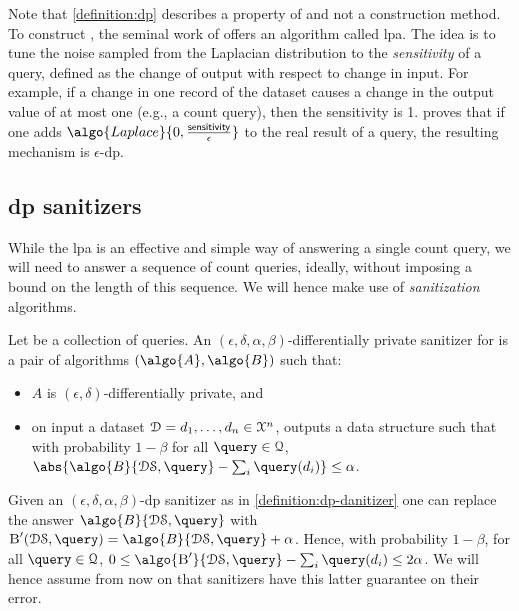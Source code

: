 		Note that \cref{definition:dp} describes a property of  and not a construction method.
		To construct , the seminal work of \textcite{differential-privacy-original} offers an algorithm called \acrfull{lpa}.
		The idea is to tune the noise sampled from the Laplacian distribution to the \emph{sensitivity} of a query, defined as the change of output with respect to change in input.
		For example, if a change in one record of the dataset causes a change in the output value of at most one (e.g., a count query), then the sensitivity is 1.
		\cite{differential-privacy-original} proves that if one adds $\algo{Laplace}{0, \frac{\mathsf{sensitivity}}{\epsilon}}$ to the real result of a query, the resulting mechanism is $\epsilon$-\acrshort{dp}.

		\subsection{\texorpdfstring{\acrshort{dp}}{DP} sanitizers}\label{section:background:dp-sanitizers}

			While the \acrlong{lpa} is an effective and simple way of answering a single count query, we will need to answer a sequence of count queries, ideally, without imposing a bound on the length of this sequence.
			We will hence make use of \emph{sanitization} algorithms.

			\begin{definition}\label{definition:dp-danitizer}
				Let \querySet{} be a collection of queries.
				An $(\epsilon, \delta, \alpha, \beta)$-differentially private sanitizer for \querySet{} is a pair of algorithms $(\algo{A}, \algo{B})$ such that:
				\begin{itemize}
					\item $A$ is $(\epsilon, \delta)$-differentially private, and
					\item on input a dataset $\mathcal{D} = d_1, \allowbreak \ldots, \allowbreak d_{n} \in \mathcal{X}^{n}$,  outputs a data structure \serverDS{} such that with probability $1 - \beta$ for all $\query \in \querySet$, $\abs{ \algo{B}{ \serverDS, \query } - \sum_i \query(d_i) } \leq \alpha$.
				\end{itemize}
			\end{definition}

			\begin{remark}\label{remark:dp-sanitizer-guarantees}
				Given an $(\epsilon, \delta, \alpha, \beta)$-\acrshort{dp} sanitizer as in \cref{definition:dp-danitizer} one can replace the answer $\algo{B}{ \serverDS, \query }$ with $\textsc{B}^\prime ( \serverDS, \allowbreak \query ) = \algo{B}{ \serverDS, \query } + \alpha$.
				Hence, with probability $1 - \beta$, for all $\query \in \querySet$, $0 \leq \algo{\ensuremath{\textsc{B}^\prime}}{ \serverDS, \query } - \sum_i \query(d_i) \leq 2 \alpha$.
				We will hence assume from now on that sanitizers have this latter guarantee on their error.
			\end{remark}

